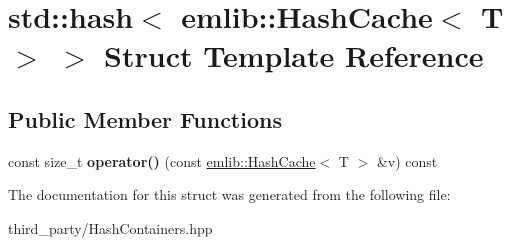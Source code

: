 \hypertarget{structstd_1_1hash_3_01emlib_1_1_hash_cache_3_01_t_01_4_01_4}{\section{std\+:\+:hash$<$ emlib\+:\+:Hash\+Cache$<$ T $>$ $>$ Struct Template Reference}
\label{structstd_1_1hash_3_01emlib_1_1_hash_cache_3_01_t_01_4_01_4}
}
\subsection*{Public Member Functions}
\begin{DoxyCompactItemize}
\item 
\hypertarget{structstd_1_1hash_3_01emlib_1_1_hash_cache_3_01_t_01_4_01_4_afa0d02b78d1cff1758f247ce93d00e17}{const size\+\_\+t {\bfseries operator()} (const \hyperlink{classemlib_1_1_hash_cache}{emlib\+::\+Hash\+Cache}$<$ T $>$ \&v) const }\label{structstd_1_1hash_3_01emlib_1_1_hash_cache_3_01_t_01_4_01_4_afa0d02b78d1cff1758f247ce93d00e17}

\end{DoxyCompactItemize}


The documentation for this struct was generated from the following file\+:\begin{DoxyCompactItemize}
\item 
third\+\_\+party/Hash\+Containers.\+hpp\end{DoxyCompactItemize}
